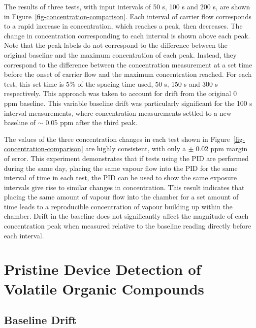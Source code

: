 \documentclass[
  a4paper,
]{scrbook}
\begin{document}
The results of three tests, with input intervals of 50 s, 100 s and 200
s, are shown in Figure~\ref{fig-concentration-comparison}. Each interval
of carrier flow corresponds to a rapid increase in concentration, which
reaches a peak, then decreases. The change in concentration
corresponding to each interval is shown above each peak. Note that the
peak labels do not correspond to the difference between the original
baseline and the maximum concentration of each peak. Instead, they
correspond to the difference between the concentration measurement at a
set time before the onset of carrier flow and the maximum concentration
reached. For each test, this set time is 5\% of the spacing time used,
50 s, 150 s and 300 s respectively. This approach was taken to account
for drift from the original 0 ppm baseline. This variable baseline drift
was particularly significant for the 100 s interval measurements, where
concentration measurements settled to a new baseline of \(\sim\) 0.05
ppm after the third peak.

The values of the three concentration changes in each test shown in
Figure~\ref{fig-concentration-comparison} are highly consistent, with
only a \(\pm\) 0.02 ppm margin of error. This experiment demonstrates
that if tests using the PID are performed during the same day, placing
the same vapour flow into the PID for the same interval of time in each
test, the PID can be used to show the same exposure intervals give rise
to similar changes in concentration. This result indicates that placing
the same amount of vapour flow into the chamber for a set amount of time
leads to a reproducible concentration of vapour building up within the
chamber. Drift in the baseline does not significantly affect the
magnitude of each concentration peak when measured relative to the
baseline reading directly before each interval.

\hypertarget{sec-pristine-EtHex}{%
\section{Pristine Device Detection of Volatile Organic
Compounds}\label{sec-pristine-EtHex}}

\hypertarget{sec-vapour-drift}{%
\subsection{Baseline Drift}\label{sec-vapour-drift}}
\end{document}
